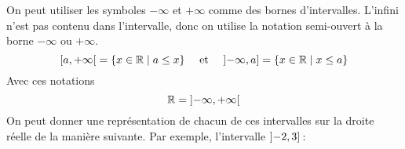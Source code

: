 \documentclass[a4paper,12pt]{report}
\begin{document}
On peut utiliser les symboles $-\infty$ et $+\infty$ comme des bornes d'intervalles. 
L'infini n'est pas contenu dans l'intervalle, donc on utilise la notation semi-ouvert à la borne $-\infty$ ou $+\infty$. 
\[\interval[open right]{a}{+\infty}=\{x\in \R \mid a\leq x\} \quad \text{ et } \quad \interval[open left]{-\infty}{a}=\{x\in \R\mid x\leq a\}\]
Avec ces notations
\[\R=\interval[open]{-\infty}{+\infty} \]
On peut donner une représentation de chacun de ces intervalles sur la droite réelle de la manière suivante. 
Par exemple, l'intervalle $\interval[open left]{-2}{3}$\,:
\begin{center}
\end{center}
\end{document}
